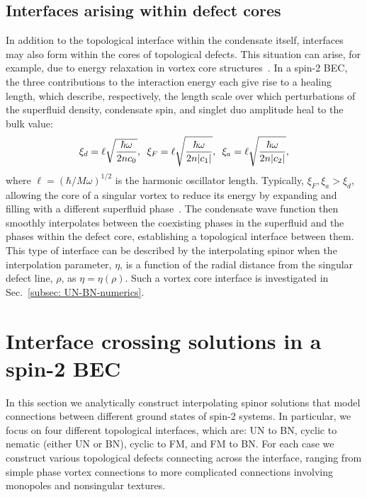 \subsection{Interfaces arising within defect cores}
In addition to the topological interface within the condensate itself,
interfaces may also form within the cores of topological defects.
This situation can arise, for example, due to energy relaxation in vortex core
structures~\cite{Ruostekoski2003,Lovegrove2012,Lovegrove2016,Borgh2016,
    Borgh2016a, Weiss2019,Xiao2021,Xiao2022}.
In a spin-2 BEC, the three contributions to the interaction energy each give
rise to a healing length, which describe, respectively, the length scale over
which perturbations of the superfluid density, condensate spin, and singlet duo
amplitude heal to the bulk value:
\begin{equation}
    \xi_d=\ell \sqrt{\frac{\hbar\omega}{2nc_0}},
    \enskip \xi_F=\ell \sqrt{\frac{\hbar\omega}{2n|c_1|}},
    \enskip \xi_a=\ell \sqrt{\frac{\hbar\omega}{2n|c_2|}},
    \label{eq: spin-2-healing-lengths}
\end{equation}
where \(\ell = {(\hbar/M\omega)}^{1/2}\) is the harmonic oscillator length.
Typically, \(\xi_F,\xi_a > \xi_d\), allowing the core of a singular vortex
to reduce its energy by expanding and filling with a different superfluid
phase~\cite{Ruostekoski2003}.
The condensate wave function then smoothly interpolates between the coexisting
phases in the superfluid and the phases within the defect core, establishing a
topological interface between them.
This type of interface can be described by the interpolating spinor when the
interpolation parameter, \(\eta\), is a function of the radial distance from the
singular defect line, \(\rho\), as \(\eta=\eta(\rho)\).
Such a vortex core interface is investigated in
Sec.~\ref{subsec: UN-BN-numerics}.

\section{Interface crossing solutions in a spin-2 BEC}
In this section we analytically construct interpolating spinor solutions that
model connections between different ground states of spin-2 systems.
In particular, we focus on four different topological interfaces, which are:
UN to BN, cyclic to nematic (either UN or BN), cyclic to FM, and
FM to BN\@.
For each case we construct various topological defects connecting across the
interface, ranging from simple phase vortex connections to more complicated
connections involving monopoles and nonsingular textures.

